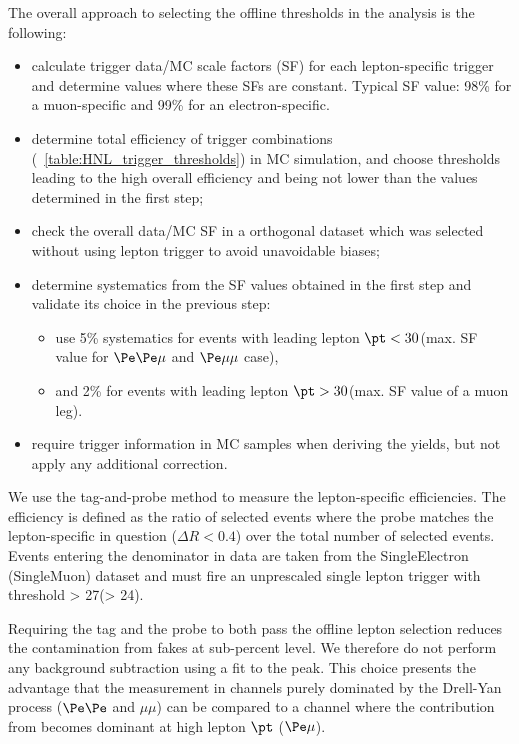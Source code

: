 The overall approach to selecting the offline thresholds in the analysis is the following:

\begin{itemize}
\setlength\itemsep{-0.1em}
\item calculate trigger data/MC scale factors (SF) for each lepton-specific trigger and determine values where these SFs are constant. Typical SF value: 98\% for a muon-specific and 99\% for an electron-specific. 
\item determine total efficiency of trigger combinations (~\ref{table:HNL_trigger_thresholds}) in MC simulation, and choose \pt thresholds leading to the high overall efficiency and being not lower than the values determined in the first step;
\item check the overall data/MC SF in a orthogonal dataset which was
  selected without using lepton trigger to avoid unavoidable biases;
\item determine systematics from the SF values obtained in the first step and validate its choice in the previous step: 
\begin{itemize}
\item use 5\% systematics for events with leading lepton $\pt < 30$\GeV (max. SF value for $\Pe\Pe\mu$ and $\Pe\mu\mu$ case),
\item and 2\% for events with leading lepton $\pt > 30$\GeV (max. SF value of a muon leg).
\end{itemize}
\item require trigger information in MC samples when deriving the yields, but not apply any additional correction.
\end{itemize}

We use the tag-and-probe method to measure the lepton-specific efficiencies. The efficiency is 
defined as the ratio of selected events where the probe matches the lepton-specific in question ($\Delta R<0.4$) over 
the total number of selected events. Events entering the denominator in data are taken from the 
SingleElectron (SingleMuon) dataset and must fire an unprescaled
single lepton trigger with \pt threshold > 27\GeV (> 24\GeV).

Requiring the tag and the probe to both pass the offline lepton selection reduces the contamination 
from fakes at sub-percent level. We therefore do not perform any background subtraction using a fit to 
the \PZ peak. This choice presents the advantage that the measurement in channels purely dominated by the 
Drell-Yan process ($\Pe\Pe$ and $\mu\mu$) can be compared to a channel where the contribution from \ttbar 
becomes dominant at high lepton $\pt$ ($\Pe\mu$).

